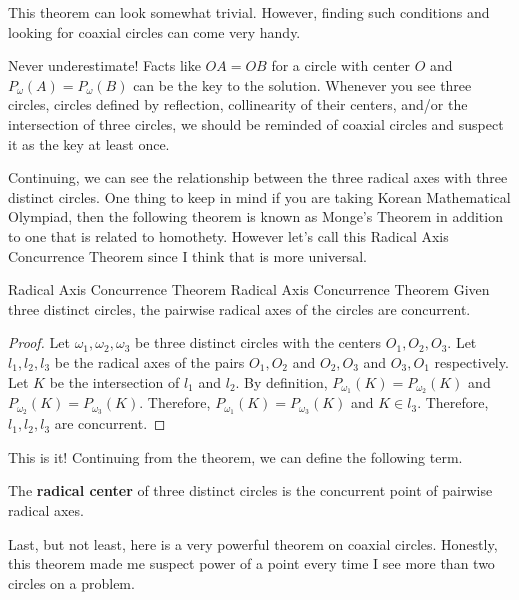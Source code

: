 \documentclass[../../../main.tex]{subfiles}
\begin{document}
This theorem can look somewhat trivial. However, finding such
conditions and looking for coaxial circles can come very handy.

\begin{important}
Never underestimate! Facts like $OA = OB$ for a circle with center
$O$ and $P_\omega(A) = P_\omega(B)$ can be the key to the solution.
Whenever you see three circles, circles defined by reflection,
collinearity of their centers, and/or the intersection of three
circles, we should be reminded of coaxial circles and suspect it as
the key at least once.
\end{important}

Continuing, we can see the relationship between the three radical
axes with three distinct circles. One thing to keep in mind if you
are taking Korean Mathematical Olympiad, then the following theorem
is known as Monge's Theorem in addition to one that is related to
homothety. However let's call this Radical Axis Concurrence Theorem
since I think that is more universal.

\begin{theorem}
{Radical Axis Concurrence Theorem}
{Radical Axis Concurrence Theorem}
Given three distinct circles, the pairwise radical axes of the
circles are concurrent.
\end{theorem}
\begin{proof}
Let $\omega_1, \omega_2, \omega_3$ be three distinct circles with
the centers $O_1, O_2, O_3$. Let $l_1, l_2, l_3$ be the radical
axes of the pairs $O_1, O_2$ and $O_2, O_3$ and $O_3, O_1$
respectively. Let $K$ be the intersection of $l_1$ and $l_2$.
By definition, $P_{\omega_1}(K) = P_{\omega_2}(K)$ and
$P_{\omega_2}(K) = P_{\omega_3}(K)$. Therefore, $P_{\omega_1}(K)
= P_{\omega_3}(K)$ and $K \in l_3$. Therefore, $l_1, l_2, l_3$
are concurrent.
\end{proof}

This is it! Continuing from the theorem, we can define the following
term.

\begin{definition}{}{}
The \textbf{radical center} of three distinct circles is the
concurrent point of pairwise radical axes.
\end{definition}

Last, but not least, here is a very powerful theorem on coaxial
circles. Honestly, this theorem made me suspect power of a point
every time I see more than two circles on a problem.
\end{document}
